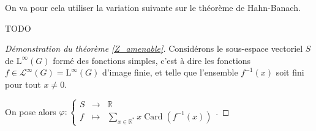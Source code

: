 \documentclass[a4paper,12pt]{article}
\newcommand{\R}{\mathbb{R}}
\newcommand\fundef[3]{#1: \left\{\begin{array}{ccc}#2\\#3\end{array}\right.}
\newcommand{\inv}{^{-1}}
\DeclareMathOperator{\card}{Card}
\begin{document}
On va pour cela utiliser la variation suivante sur le théorème de Hahn-Banach.

TODO

\begin{proof}[Démonstration du théorème \ref{Z_amenable}]
    Considérons le sous-espace vectoriel $S$ de $\mathrm{L}^\infty(G)$ formé des fonctions simples,
    c'est à dire les fonctions $f \in\mathscr{L}^\infty(G)=\mathrm{L}^\infty(G)$ d'image finie,
    et telle que l'ensemble $f\inv(x)$ soit fini pour tout $x\ne0$.

    On pose alors $\fundef{\varphi}{S&\to&\R}{f&\mapsto&\sum_{x\in\R^*} x\card(f\inv(x))}$.
\end{proof}
\end{document}
